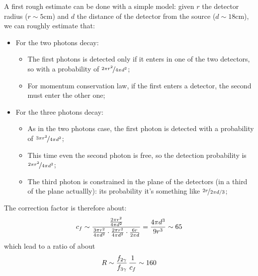 \documentclass[11pt,a4 paper]{article}
\let\oldfrac\frac
\renewcommand{\frac}[3][d]{\ifthenelse{\equal{#1}{d}}{\oldfrac{#2}{#3}}{\nicefrac{#2}{#3}}}
\begin{document}
A first rough estimate can be done with a simple model: given $r$ the detector radius ($r\sim5\si{\centi\meter}$) and $d$ the distance of the detector from the source ($d\sim18\si{\centi\meter}$), we can roughly estimate that:
\begin{itemize}[noitemsep]
    \item For the two photons decay:
    \begin{itemize}[noitemsep]
        \item The first photons is detected only if it enters in one of the two detectors, so with a probability of $\frac[f]{2\pi r^2}{4\pi d^2}$;
        \item For momentum conservation law, if the first enters a detector, the second must enter the other one;
    \end{itemize}
    \item For the three photons decay:
    \begin{itemize}[noitemsep]
        \item As in the two photons case, the first photon is detected with a probability of $\frac[f]{3 \pi r^2}{4\pi d^2}$;
        \item This time even the second photon is free, so the detection probability is $\frac[f]{2 \pi r^2}{4\pi d^2}$;
        \item The third photon is constrained in the plane of the detectors (in a third of the plane actuallly): its probability it's something like  $\frac[f]{2r}{2\pi d/3}$;
    \end{itemize}
\end{itemize}
The correction factor is therefore about:
    \begin{equation}
        c_f \sim \frac{\frac{2 \pi r^2}{4\pi d^2}}{\frac{3 \pi r^2}{4\pi d^2}\cdot\frac{2 \pi r^2}{4\pi d^2}\cdot \frac{6r}{2\pi d}} = \frac{4\pi d^3}{9r^3} \sim 65
    \end{equation}
which lead to a ratio of about
\begin{equation}
    R \sim \frac{f_{2\gamma}}{f_{3\gamma}} \,\frac{1}{c_f} \sim 160
\end{equation}


\end{document}
